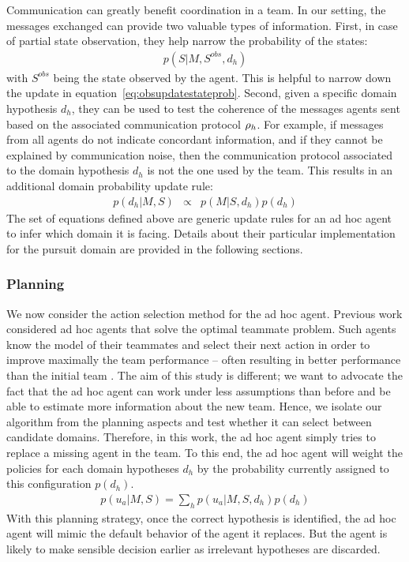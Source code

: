 Communication can greatly benefit coordination in a team. In our setting, the messages exchanged can provide two valuable types of information. First, in case of partial state observation, they help narrow the probability of the states:
%
\begin{eqnarray}
p(S|M, S^{obs}, d_h)
\label{eq:stateupdate}
\end{eqnarray}
%
with $S^{obs}$ being the state observed by the agent. This is helpful to narrow down the update in equation~\ref{eq:obsupdatestateprob}. Second, given a specific domain hypothesis $d_h$, they can be used to test the coherence of the messages agents sent based on the associated communication protocol $\rho_h$. For example, if messages from all agents do not indicate concordant information, and if they cannot be explained by communication noise, then the communication protocol associated to the domain hypothesis $d_h$ is not the one used by the team. This results in an additional domain probability update rule:
%
\begin{eqnarray}
p(d_h|M,S) &\propto& p(M|S,d_h) p(d_h)
\label{eq:messageupdate}
\end{eqnarray}
%
The set of equations defined above are generic update rules for an ad hoc agent to infer which domain it is facing. Details about their particular implementation for the pursuit domain are provided in the following sections.

\subsubsection{Planning}

We now consider the action selection method for the ad hoc agent. Previous work considered ad hoc agents that solve the optimal teammate problem. Such agents know the model of their teammates and select their next action in order to improve maximally the team performance -- often resulting in better performance than the initial team \cite{barrett2011empirical}. The aim of this study is different; we want to advocate the fact that the ad hoc agent can work under less assumptions than before and be able to estimate more information about the new team. Hence, we isolate our algorithm from the planning aspects and test whether it can select between candidate domains. Therefore, in this work, the ad hoc agent simply tries to replace a missing agent in the team. To this end, the ad hoc agent will weight the policies for each domain hypotheses $d_h$ by the probability currently assigned to this configuration $p(d_h)$.
%
\begin{eqnarray}
p(u_a|M, S) = \sum_h p(u_a|M, S, d_h) p(d_h)
\label{eq:adhocpolicy}
\end{eqnarray}
%
With this planning strategy, once the correct hypothesis is identified, the ad hoc agent will mimic the default behavior of the agent it replaces. But the agent is likely to make sensible decision earlier as irrelevant hypotheses are discarded.

